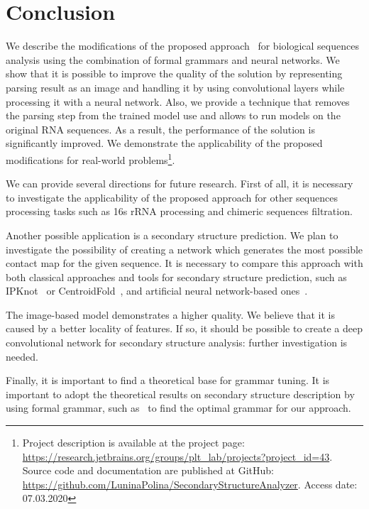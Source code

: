 \section{Conclusion}
We describe the modifications of the proposed approach~\cite{grigorevcomposition} for biological sequences analysis using the combination of formal grammars and neural networks.
We show that it is possible to improve the quality of the solution by representing parsing result as an image and handling it by using convolutional layers while processing it with a neural network.
Also, we provide a technique that removes the parsing step from the trained model use and allows to run models on the original RNA sequences.
As a result, the performance of the solution is significantly improved.
We demonstrate the applicability of the proposed modifications for real-world problems\footnote{
Project description is available at the project page: \url{https://research.jetbrains.org/groups/plt\_lab/projects?project\_id=43}.
Source code and documentation are published at GitHub: \url{https://github.com/LuninaPolina/SecondaryStructureAnalyzer}. Access date: 07.03.2020}.

We can provide several directions for future research.
First of all, it is necessary to investigate the applicability of the proposed approach for other sequences processing tasks such as 16s rRNA processing and chimeric sequences filtration.

Another possible application is a secondary structure prediction.
We plan to investigate the possibility of creating a network which generates the most possible contact map for the given sequence.
It is necessary to compare this approach with both classical approaches and tools for secondary structure prediction, such as IPKnot~\cite{10.1093/bioinformatics/btr215} or CentroidFold~\cite{sato2009centroidfold}, and artificial neural network-based ones~\cite{Lu2019,Singh2019}.

The image-based model demonstrates a higher quality.
We believe that it is caused by a better locality of features.
If so, it should be possible to create a deep convolutional network for secondary structure analysis: further investigation is needed.

Finally, it is important to find a theoretical base for grammar tuning.
It is important to adopt the theoretical results on secondary structure description by using formal grammar, such as~\cite{MQbioinformatics19} to find the optimal grammar for our approach.
